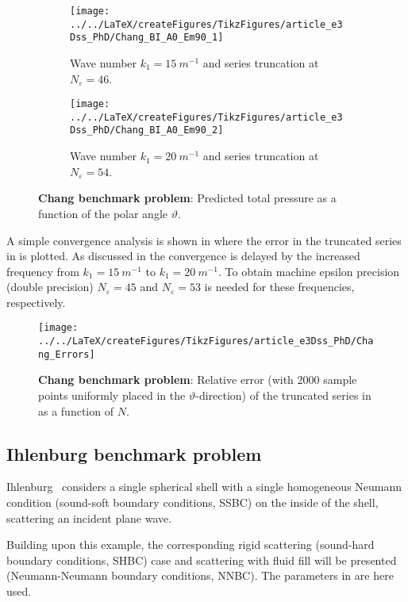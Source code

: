 \begin{figure}
	\centering
	\begin{subfigure}[t]{\textwidth}
		\centering
		\texttt{[image: ../../LaTeX/createFigures/TikzFigures/article\_e3Dss\_PhD/Chang\_BI\_A0\_Em90\_1]}
		\caption{Wave number $k_1=\SI{15}{m^{-1}}$ and series truncation at $N_\varepsilon = 46$.}
		\label{Fig1:Chang1}
	\end{subfigure}
	\par\bigskip
	\begin{subfigure}[t]{\textwidth}
		\centering
		\texttt{[image: ../../LaTeX/createFigures/TikzFigures/article\_e3Dss\_PhD/Chang\_BI\_A0\_Em90\_2]}
		\caption{Wave number $k_1=\SI{20}{m^{-1}}$ and series truncation at $N_\varepsilon = 54$.}
		\label{Fig1:Chang2}
	\end{subfigure}
	\caption{\textbf{Chang benchmark problem}: Predicted total pressure as a function of the polar angle $\vartheta$.}
\end{figure}

A simple convergence analysis is shown in  where the error in the truncated series in  is plotted. As discussed in  the convergence is delayed by the increased frequency from $k_1=\SI{15}{m^{-1}}$ to $k_1=\SI{20}{m^{-1}}$. To obtain machine epsilon precision (double precision) $N_\varepsilon=45$ and $N_\varepsilon=53$ is needed for these frequencies, respectively.
\begin{figure}
	\centering
	\texttt{[image: ../../LaTeX/createFigures/TikzFigures/article\_e3Dss\_PhD/Chang\_Errors]}
	\caption{\textbf{Chang benchmark problem}: Relative error (with 2000 sample points uniformly placed in the $\vartheta$-direction) of the truncated series in  as a function of $N$.}
	\label{Fig1:ChangErrors}
\end{figure}

\subsection{Ihlenburg benchmark problem} 
Ihlenburg~\cite{Ihlenburg1998fea} considers a single spherical shell with a single homogeneous Neumann condition (sound-soft boundary conditions, SSBC) on the inside of the shell, scattering an incident plane wave. 

Building upon this example, the corresponding rigid scattering (sound-hard boundary conditions, SHBC) case and scattering with fluid fill will be presented (Neumann-Neumann boundary conditions, NNBC). The parameters in  are here used. 

